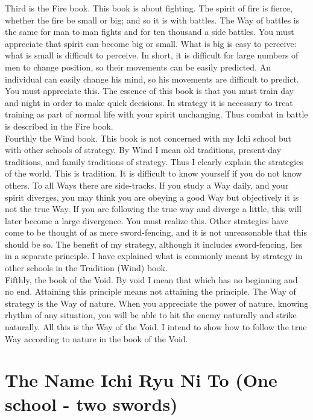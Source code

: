 Third is the Fire book. This book is about fighting. The spirit of fire is fierce, whether the fire be small or big; and so it is with battles. The Way of battles is the same for man to man fights and for ten thousand a side battles. You must appreciate that spirit can become big or small. What is big is easy to perceive: what is small is difficult to perceive. In short, it is difficult for large numbers of men to change position, so their movements can be easily predicted. An individual can easily change his mind, so his movements are difficult to predict. You must appreciate this. The essence of this book is that you must train day and night in order to make quick decisions. In strategy it is necessary to treat training as part of normal life with your spirit unchanging. Thus combat in battle is described in the Fire book.\\

Fourthly the Wind book. This book is not concerned with my Ichi school but with other schools of strategy. By Wind I mean old traditions, present-day traditions, and family traditions of strategy. Thus I clearly explain the strategies of the world. This is tradition. It is difficult to know yourself if you do not know others. To all Ways there are side-tracks. If you study a Way daily, and your spirit diverges, you may think you are obeying a good Way but objectively it is not the true Way. If you are following the true way and diverge a little, this will later become a large divergence. You must realize this. Other strategies have come to be thought of as mere sword-fencing, and it is not unreasonable that this should be so. The benefit of my strategy, although it includes sword-fencing, lies in a separate principle. I have explained what is commonly meant by strategy in other schools in the Tradition (Wind) book.\\

Fifthly, the book of the Void. By void I mean that which has no beginning and no end. Attaining this principle means not attaining the principle. The Way of strategy is the Way of nature. When you appreciate the power of nature, knowing rhythm of any situation, you will be able to hit the enemy naturally and strike naturally. All this is the Way of the Void. I intend to show how to follow the true Way according to nature in the book of the Void.\\
\section{The Name Ichi Ryu Ni To (One school - two swords)}

